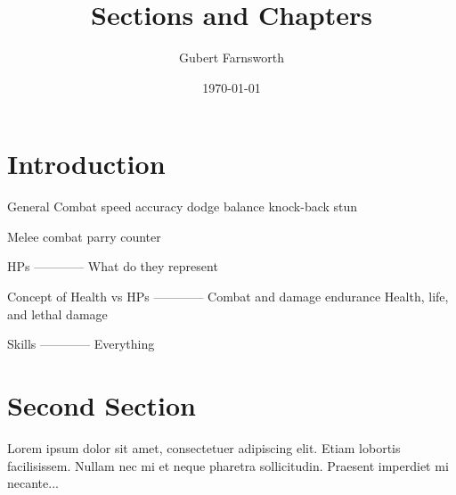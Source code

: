 \documentclass{article}
\title{Sections and Chapters}
\author{Gubert Farnsworth}
\date{\today}
\begin{document}
 
\maketitle
 
\section{Introduction}

General Combat
speed 
accuracy
dodge
balance
knock-back
stun

 
Melee combat
parry
counter






HPs
------------
What do they represent




Concept of Health vs HPs
------------
Combat and damage endurance
Health, life, and lethal damage







Skills
------------
Everything 



 
\section{Second Section}
 
Lorem ipsum dolor sit amet, consectetuer adipiscing elit.  
Etiam lobortis facilisissem.  Nullam nec mi et neque pharetra 
sollicitudin.  Praesent imperdiet mi necante...
 
\end{document}
